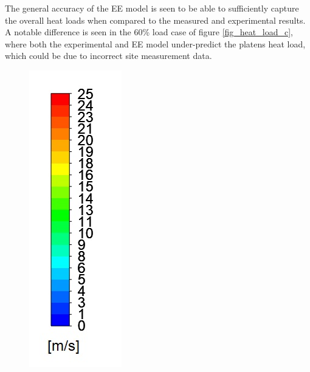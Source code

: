 \documentclass{webofc}
\begin{document}
The general accuracy of the EE model is seen to be able to sufficiently capture the overall heat loads when compared to the measured and experimental results. A notable difference is seen in the 60\% load case of figure \ref{fig_heat_load_c}, where both the experimental and EE model under-predict the platens heat load, which could be due to incorrect site measurement data.
\begin{figure}[h!]
\centering
\includegraphics[scale = 0.3]{velo}

\end{figure}
\end{document}
